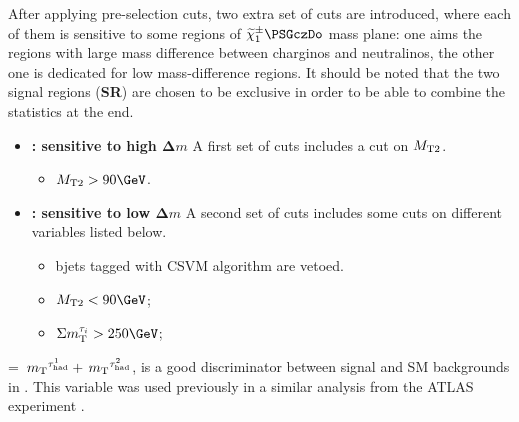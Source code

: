 After applying pre-selection cuts, two extra set of cuts are introduced, where each of them is sensitive to some regions of $\chione\PSGczDo$ mass plane: one aims the regions with large mass difference between charginos and neutralinos, the other one is dedicated for low mass-difference regions. It should be noted that the two signal regions ({\bf SR}) are chosen to be exclusive in order to be able to combine the statistics at the end.
\begin{itemize}
\item {\bf \binone: sensitive to high $\boldsymbol\Delta m$}
A first set of cuts includes a cut on ${M_{\rm T2}}$.
\begin{itemize}
\item $\mttwo>90\GeV$.
\end{itemize}
\item {\bf \bintwo: sensitive to low $\boldsymbol\Delta m$}
A second set of cuts includes some cuts on different variables listed below.
\begin{itemize}
\item bjets tagged with CSVM algorithm are vetoed.
\item $\mttwo<90\GeV$;
\item $\SumMT>250\GeV$;
\end{itemize}
\end{itemize}
\SumMT = $\,{m_{\rm T}}^{\tau_{\rm had}^1} + \,{m_{\rm T}}^{\tau_{\rm had}^2}$, is a good discriminator
between signal and SM backgrounds in \bintwo. 
This variable was used previously in a similar analysis from the ATLAS experiment \cite{Aad:2014yka}.


